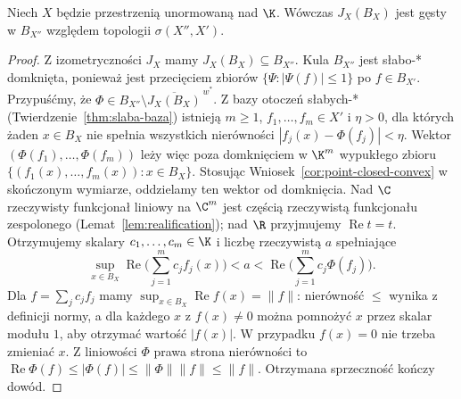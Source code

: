 \begin{twierdzenie}[Goldstine]
\label{thm:goldstine26}
Niech $X$ będzie przestrzenią unormowaną nad $\K$.
Wówczas $J_X(B_X)$ jest gęsty w $B_{X''}$ względem topologii
$\sigma(X'',X')$.
\end{twierdzenie}
\begin{proof}
Z izometryczności $J_X$ mamy $J_X(B_X)\subseteq B_{X''}$.
Kula $B_{X''}$ jest słabo-* domknięta, ponieważ jest
przecięciem zbiorów $\{\Psi:|\Psi(f)|\le1\}$ po
$f\in B_{X'}$. Przypuśćmy, że
$\Phi\in B_{X''}\setminus\overline{J_X(B_X)}^{\,w^\ast}$.
Z bazy otoczeń słabych-* (Twierdzenie~\ref{thm:slaba-baza})
istnieją $m\ge1$, $f_1,\ldots,f_m\in X'$ i $\eta>0$,
dla których żaden $x\in B_X$ nie spełnia wszystkich
nierówności $|f_j(x)-\Phi(f_j)|<\eta$.
Wektor $(\Phi(f_1),\ldots,\Phi(f_m))$ leży więc poza
domknięciem w $\K^m$ wypukłego zbioru
$\{(f_1(x),\ldots,f_m(x)):x\in B_X\}$.
Stosując Wniosek~\ref{cor:point-closed-convex} w
skończonym wymiarze, oddzielamy ten wektor od domknięcia.
Nad $\C$ rzeczywisty funkcjonał liniowy na $\C^m$
jest częścią rzeczywistą funkcjonału zespolonego
(Lemat~\ref{lem:realification}); nad $\R$ przyjmujemy
$\operatorname{Re}t=t$. Otrzymujemy skalary
$c_1,\ldots,c_m\in\K$ i liczbę rzeczywistą $a$ spełniające
\[
\sup_{x\in B_X}\operatorname{Re}\Big(\sum_{j=1}^m c_jf_j(x)\Big)
<a<\operatorname{Re}\Big(\sum_{j=1}^m c_j\Phi(f_j)\Big).
\]
Dla $f=\sum_jc_jf_j$ mamy
$\sup_{x\in B_X}\operatorname{Re}f(x)=\|f\|$:
nierówność $\le$ wynika z definicji normy, a dla
każdego $x$ z $f(x)\ne0$ można pomnożyć $x$ przez
skalar modułu $1$, aby otrzymać wartość $|f(x)|$.
W przypadku $f(x)=0$ nie trzeba zmieniać $x$.
Z liniowości $\Phi$ prawa strona nierówności to
$\operatorname{Re}\Phi(f)\le|\Phi(f)|\le\|\Phi\|\|f\|
\le\|f\|$. Otrzymana sprzeczność kończy dowód.
\end{proof}

